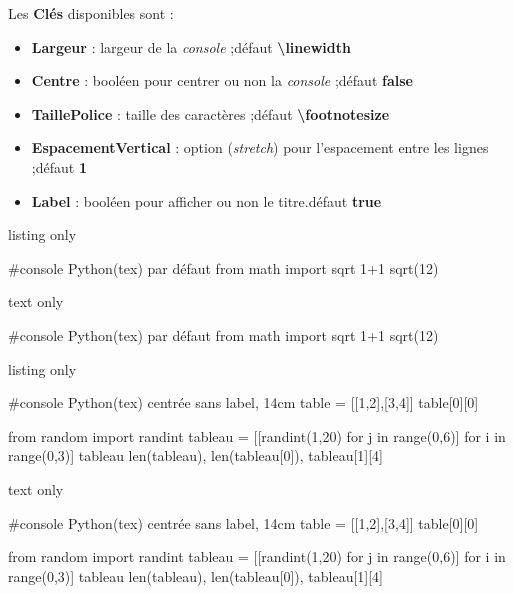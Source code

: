 \documentclass[a4paper,french,11pt]{article}
\newcommand\Cle[1]{{\bfseries\sffamily\textlangle \textcolor{orange!75!black}{#1}\textrangle}}
\begin{document}
\begin{cautionblock}
Les \Cle{Clés} disponibles sont :

\begin{itemize}
	\item \Cle{Largeur} : largeur de la \textit{console} ;\hfill{}défaut \Cle{\textbackslash linewidth}
	\item \Cle{Centre} : booléen pour centrer ou non la \textit{console} ;\hfill{}défaut \Cle{false}
	\item \Cle{TaillePolice} : taille des caractères ;\hfill{}défaut \Cle{\textbackslash footnotesize}
	\item \Cle{EspacementVertical} : option (\textit{stretch}) pour l'espacement entre les lignes ;\hfill{}défaut \Cle{1}
	\item \Cle{Label} : booléen pour afficher ou non le titre.\hfill{}défaut \Cle{true}
\end{itemize}
\vspace*{-\baselineskip}\leavevmode
\end{cautionblock}

\begin{PresCodeTexPL}{listing only}
\begin{ConsolePythontex}{}
	#console Python(tex) par défaut
	from math import sqrt
	1+1
	sqrt(12)
\end{ConsolePythontex}
\end{PresCodeTexPL}

\begin{PresCodeSortiePL}{text only}
\smallskip
\begin{ConsolePythontex}{}
	#console Python(tex) par défaut
	from math import sqrt
	1+1
	sqrt(12)
\end{ConsolePythontex}
\end{PresCodeSortiePL}

\begin{PresCodeTexPL}{listing only}
\begin{ConsolePythontex}[Largeur=14cm,Label=false,Centre]{}
	#console Python(tex) centrée sans label, 14cm
	table = [[1,2],[3,4]]
	table[0][0]
	
	from random import randint
	tableau = [[randint(1,20) for j in range(0,6)] for i in range(0,3)]
	tableau
	len(tableau), len(tableau[0]), tableau[1][4]
\end{ConsolePythontex}
\end{PresCodeTexPL}

\begin{PresCodeSortiePL}{text only}
\smallskip
\begin{ConsolePythontex}[Largeur=14cm,Label=false,Centre]{}
	#console Python(tex) centrée sans label, 14cm
	table = [[1,2],[3,4]]
	table[0][0]
	
	from random import randint
	tableau = [[randint(1,20) for j in range(0,6)] for i in range(0,3)]
	tableau
	len(tableau), len(tableau[0]), tableau[1][4]
\end{ConsolePythontex}
\end{PresCodeSortiePL}
\end{document}
